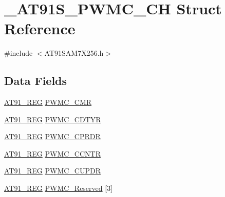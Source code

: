 \hypertarget{struct__AT91S__PWMC__CH}{\section{\-\_\-\-A\-T91\-S\-\_\-\-P\-W\-M\-C\-\_\-\-C\-H Struct Reference}
\label{struct__AT91S__PWMC__CH}
}


{\ttfamily \#include $<$A\-T91\-S\-A\-M7\-X256.\-h$>$}

\subsection*{Data Fields}
\begin{DoxyCompactItemize}
\item 
\hyperlink{GCC_2ARM7__AT91SAM7S_2AT91SAM7X256_8h_a712ad5a1ac1bd02f3e95a7526c283ce1}{A\-T91\-\_\-\-R\-E\-G} \hyperlink{struct__AT91S__PWMC__CH_adbb97a3f0b481aadf70b44eb09dab317}{P\-W\-M\-C\-\_\-\-C\-M\-R}
\item 
\hyperlink{GCC_2ARM7__AT91SAM7S_2AT91SAM7X256_8h_a712ad5a1ac1bd02f3e95a7526c283ce1}{A\-T91\-\_\-\-R\-E\-G} \hyperlink{struct__AT91S__PWMC__CH_a26e04d9e84c8a4e470e63ba4166ef707}{P\-W\-M\-C\-\_\-\-C\-D\-T\-Y\-R}
\item 
\hyperlink{GCC_2ARM7__AT91SAM7S_2AT91SAM7X256_8h_a712ad5a1ac1bd02f3e95a7526c283ce1}{A\-T91\-\_\-\-R\-E\-G} \hyperlink{struct__AT91S__PWMC__CH_a9bd363b91bbf1fad7c2205b403f4bda0}{P\-W\-M\-C\-\_\-\-C\-P\-R\-D\-R}
\item 
\hyperlink{GCC_2ARM7__AT91SAM7S_2AT91SAM7X256_8h_a712ad5a1ac1bd02f3e95a7526c283ce1}{A\-T91\-\_\-\-R\-E\-G} \hyperlink{struct__AT91S__PWMC__CH_ae1a9fb05c89fe1a67b8a519ac04cff88}{P\-W\-M\-C\-\_\-\-C\-C\-N\-T\-R}
\item 
\hyperlink{GCC_2ARM7__AT91SAM7S_2AT91SAM7X256_8h_a712ad5a1ac1bd02f3e95a7526c283ce1}{A\-T91\-\_\-\-R\-E\-G} \hyperlink{struct__AT91S__PWMC__CH_abb4f81af917724b30274a8c08918ea32}{P\-W\-M\-C\-\_\-\-C\-U\-P\-D\-R}
\item 
\hyperlink{GCC_2ARM7__AT91SAM7S_2AT91SAM7X256_8h_a712ad5a1ac1bd02f3e95a7526c283ce1}{A\-T91\-\_\-\-R\-E\-G} \hyperlink{struct__AT91S__PWMC__CH_ada98ecbec7cd83bce1e5ec85c25a463d}{P\-W\-M\-C\-\_\-\-Reserved} \mbox{[}3\mbox{]}
\end{DoxyCompactItemize}


